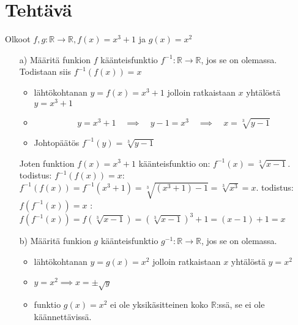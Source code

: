 \documentclass{article}
\newcounter{tehtava}
\begin{document}
    \newpage
    \section*{Tehtävä \thetehtava}
    Olkoot $f, g: \mathbb{R} \rightarrow \mathbb{R}, f(x) = x^3 + 1$ ja $g(x) = x^2$
    \begin{itemize}
        \item[a)] Määritä funkion $f$ käänteisfunktio $f^{-1}:\mathbb{R} \rightarrow \mathbb{R}$, jos se on olemassa.\newline
        Todistaan siis $f^{-1} (f(x)) = x$
        \begin{itemize}
            \item lähtökohtanan $y = f(x) = x^3 + 1$ jolloin ratkaistaan $x$ yhtälöstä $y = x^3 + 1$
            \item \[y = x^3 + 1 \quad \implies \quad y - 1 = x^3 \quad \implies \quad x = \sqrt[3]{y - 1} \]
            \item Johtopäätös $f^{-1}(y) = \sqrt[3]{y - 1}$
        \end{itemize}
        Joten funktion $f(x) = x^3 + 1$ käänteisfunktio on: $f^{-1}(x) = \sqrt[3]{x - 1}$. todistus: $f^{-1}(f(x)) = x$: \newline
        $f^{-1}(f(x)) = f^{-1}(x^3 + 1) = \sqrt[3]{(x^3 + 1) - 1} = \sqrt[3]{x^3} = x$. todistus: $f(f^{-1}(x)) = x$ :\newline
        $f(f^{-1}(x)) = f\left(\sqrt[3]{x - 1}\right) = \left(\sqrt[3]{x - 1}\right)^3 + 1 = (x - 1) + 1 = x$
        \item[b)] Määritä funkion $g$ käänteisfunktio $g^{-1}:\mathbb{R} \rightarrow \mathbb{R}$, jos se on olemassa.
        \begin{itemize}
            \item lähtökohtanan $y = g(x) = x^2$ jolloin ratkaistaan $x$ yhtälöstä $y = x^2$
            \item $y = x^2 \implies x = \pm \sqrt{y}$
            \item funktio $g(x) = x^2$ ei ole yksikäsitteinen koko $\mathbb{R}$:ssä, se ei ole käännettävissä.
        \end{itemize}

    \end{itemize}
\end{document}
